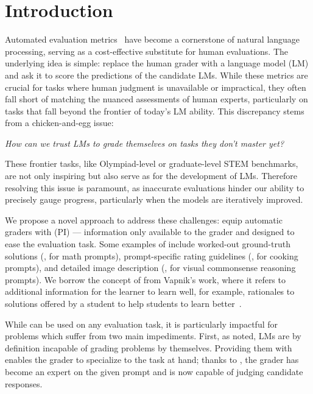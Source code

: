 
% 


\section{Introduction}\label{sec:introduction}

Automated evaluation metrics~\citep{Papineni2001-xx,Zheng2023-mh,Vu2024-nh} have become a cornerstone of natural language processing, serving as a cost-effective substitute for human evaluations.
The underlying idea is simple: replace the human grader with a language model (LM) and ask it to score the predictions of the candidate LMs.
While these metrics are crucial for tasks where human judgment is unavailable or impractical, they often fall short of matching the nuanced assessments of human experts, particularly on tasks that fall beyond the frontier of today's LM ability.
This discrepancy stems from a chicken-and-egg issue:
%
\begin{center}
    \emph{How can we trust LMs to grade themselves on tasks they don't master yet?}
\end{center}
%
These frontier tasks, like Olympiad-level or graduate-level STEM benchmarks, are not only inspiring but also serve as \NS for the development of LMs. \citep{Rein2023-ga, Fang2024-go, Trinh2024-ky, OpenAI-O1}
Therefore resolving this issue is paramount, as inaccurate evaluations hinder our ability to precisely gauge progress, particularly when the models are iteratively improved.

We propose a novel approach to address these challenges: equip automatic graders with \emph{\PI} (PI) --- information only available to the grader and designed to ease the evaluation task.
Some examples of \PI include worked-out ground-truth solutions (\eg, for math prompts), prompt-specific rating guidelines (\eg, for cooking prompts), and detailed image description (\eg, for visual commonsense reasoning prompts).
We borrow the concept of \PI from Vapnik's work, where it refers to additional information for the learner to learn well, for example, rationales to solutions offered by a student to help students to learn better~\citep[Postscript]{Vapnik1982-lw}. 

While \PI can be used on any evaluation task, it is particularly impactful for \NS problems which suffer from two main impediments.
First, as noted, LMs are by definition incapable of grading \NS problems by themselves.
Providing them with \PI enables the grader to specialize to the task at hand; thanks to \PI, the grader has become an expert on the given prompt and is now capable of judging candidate responses.

